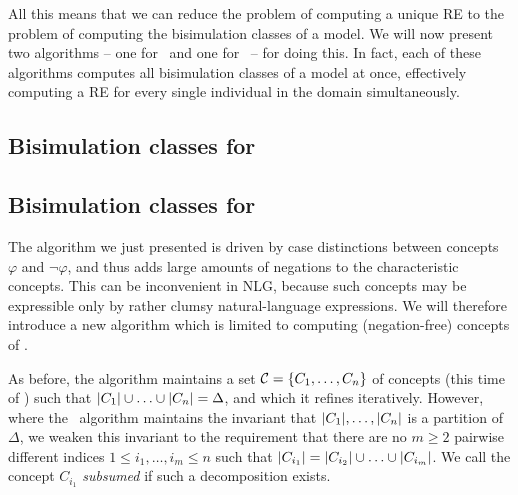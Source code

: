 All this means that we can reduce the problem of computing a unique RE
to the problem of computing the bisimulation classes of a model.  We
will now present two algorithms -- one for \alc\ and one for \el\ --
for doing this.  In fact, each of these algorithms computes all
bisimulation classes of a model at once, effectively computing a RE
for every single individual in the domain simultaneously.


\subsection{Bisimulation classes for \alc}


\subsection{Bisimulation classes for \el}

The algorithm we just presented is driven by case distinctions between
concepts $\varphi$ and $\neg \varphi$, and thus adds large amounts of
negations to the characteristic concepts.  This can be inconvenient
in NLG, because such concepts may be expressible only by rather clumsy
natural-language expressions.   We will therefore
introduce a new algorithm which is limited to computing
(negation-free) concepts of \el.  

As before, the algorithm maintains a set $\mathcal{C} = \{C_1,\ldots,C_n\}$ of
concepts (this time of \el) such that $|C_1| \cup \ldots \cup
|C_n| = \Delta$, and which it refines iteratively.  However,
where the \alc\ algorithm maintains the invariant that
$|C_1|,\ldots,|C_n|$ is a partition of $\Delta$, we
weaken this invariant to the requirement that there are no $m \geq 2$
pairwise different indices $1 \leq i_1,\ldots,i_m \leq n$ such that
$|C_{i_1}| = |C_{i_2}| \cup \ldots \cup
|C_{i_m}|$.  We call the concept $C_{i_1}$ \emph{subsumed} if
such a decomposition exists.





